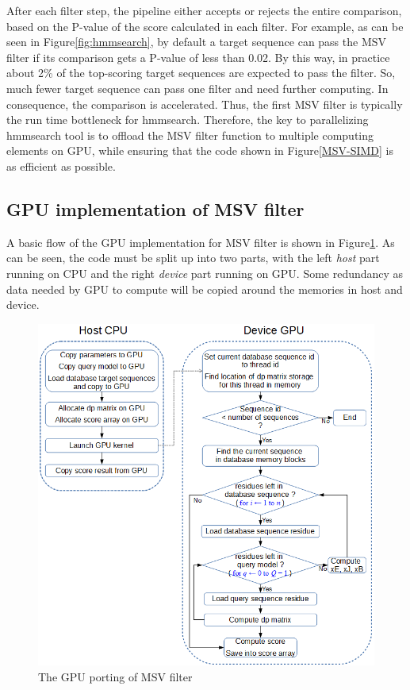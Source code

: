 \label{hmmsearch}
After each filter step, the pipeline either accepts or rejects the entire comparison, based on the P-value of the score calculated in each filter. For example, as can be seen in Figure\ref{fig:hmmsearch}, by default a target sequence can pass the MSV filter if its comparison gets a P-value of less than 0.02. By this way, in practice about 2\% of the top-scoring target sequences are expected to pass the filter. So, much fewer target sequence can pass one filter and need further computing. In consequence, the comparison is accelerated. Thus, the first MSV filter is typically the run time bottleneck for hmmsearch. Therefore, the key to parallelizing hmmsearch tool is to offload the MSV filter function to multiple computing elements on GPU, while ensuring that the code shown in Figure\ref{MSV-SIMD} is as efficient as possible.

\subsection{GPU implementation of MSV filter}

A basic flow of the GPU implementation for MSV filter is shown in Figure\ref{fig:gpuMSV}. As can be seen, the code must be split up into two parts, with the left \emph{host} part running on CPU and the right \emph{device} part running on GPU. Some redundancy as data needed by GPU to compute will be copied around the memories in host and device.

\begin{figure}[!htb]
 \centering
 \includegraphics[totalheight=0.6\textheight]{Figures/gpuMSV.png}
 \caption{\selectfont The GPU porting of MSV filter}
 \label{fig:gpuMSV}
\end{figure}

